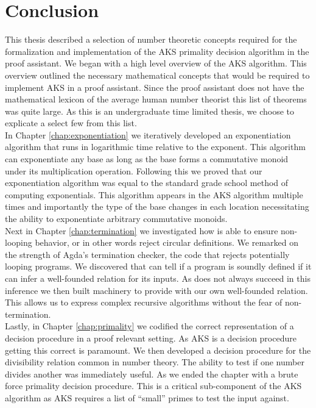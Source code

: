 \documentclass[./Thesis.tex]{subfiles}
\begin{document}
\chapter*{Conclusion}

This thesis described a selection of number theoretic concepts required for the
formalization and implementation of the AKS primality decision algorithm in the
\Agda{} proof assistant. We began with a high level overview of the AKS
algorithm. This overview outlined the necessary mathematical concepts that would
be required to implement AKS in a proof assistant. Since the \Agda{} proof
assistant does not have the mathematical lexicon of the average human number
theorist this list of theorems was quite large. As this is an undergraduate time
limited thesis, we choose to explicate a select few from this list. \\

In Chapter \ref{chap:exponentiation} we iteratively developed an exponentiation
algorithm that runs in logarithmic time relative to the exponent. This algorithm
can exponentiate any base as long as the base forms a commutative monoid under
its multiplication operation. Following this we proved that our exponentiation
algorithm was equal to the standard grade school method of computing
exponentials. This algorithm appears in the AKS algorithm multiple times and
importantly the type of the base changes in each location necessitating the
ability to exponentiate arbitrary commutative monoids. \\

Next in Chapter \ref{chap:termination} we investigated how \Agda{} is able to
ensure non-looping behavior, or in other words reject circular definitions. We
remarked on the strength of Agda's termination checker, the code that rejects
potentially looping programs. We discovered that \Agda{} can tell if a program
is soundly defined if it can infer a well-founded relation for its inputs. As
\Agda{} does not always succeed in this inference we then built machinery to
provide \Agda{} with our own well-founded relation. This allows us to express
complex recursive algorithms without the fear of non-termination. \\

Lastly, in Chapter \ref{chap:primality} we codified the correct representation of a
decision procedure in a proof relevant setting. As AKS is a decision procedure
getting this correct is paramount. We then developed a decision procedure for
the divisibility relation common in number theory. The ability to test if one
number divides another was immediately useful. As we ended the chapter with a
brute force primality decision procedure. This is a critical sub-component of the
AKS algorithm as AKS requires a list of ``small'' primes to test the input
against. \\
\end{document}
